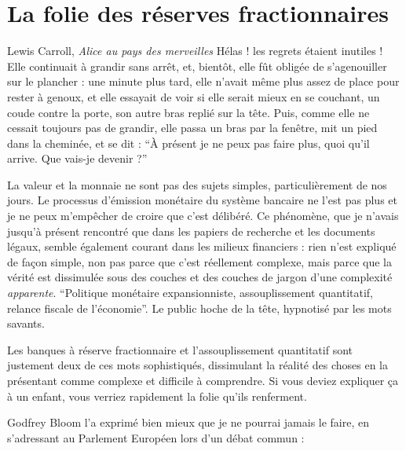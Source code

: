\chapter{La folie des réserves fractionnaires}
\label{les:13}

\begin{chapquote}{Lewis Carroll, \textit{Alice au pays des merveilles}}
Hélas ! les regrets étaient inutiles ! Elle continuait à grandir sans arrêt, et,
bientôt, elle fût obligée de s’agenouiller sur le plancher : une minute plus
tard, elle n’avait même plus assez de place pour rester à genoux, et elle
essayait de voir si elle serait mieux en se couchant, un coude contre la porte,
son autre bras replié sur la tête. Puis, comme elle ne cessait toujours pas de
grandir, elle passa un bras par la fenêtre, mit un pied dans la cheminée, et se
dit : \enquote{À présent je ne peux pas faire plus, quoi qu’il arrive. Que
vais-je devenir ?}
\end{chapquote}

La valeur et la monnaie ne sont pas des sujets simples, particulièrement de nos
jours. Le processus d'émission monétaire du système bancaire ne l'est pas plus
et je ne peux m'empêcher de croire que c'est délibéré. Ce phénomène, que je
n'avais jusqu'à présent rencontré que dans les papiers de recherche et les
documents légaux, semble également courant dans les milieux financiers : rien
n'est expliqué de façon simple, non pas parce que c'est réellement complexe,
mais parce que la vérité est dissimulée sous des couches et des couches de
jargon d'une complexité \textit{apparente}. \enquote{Politique monétaire
expansionniste, assouplissement quantitatif, relance fiscale de l'économie}. Le
public hoche de la tête, hypnotisé par les mots savants.

Les banques à réserve fractionnaire et l'assouplissement quantitatif sont
justement deux de ces mots sophistiqués, dissimulant la réalité des choses en la
présentant comme complexe et difficile à comprendre. Si vous deviez expliquer ça
à un enfant, vous verriez rapidement la folie qu'ils renferment.

Godfrey Bloom l'a exprimé bien mieux que je ne pourrai jamais le faire, en
s'adressant au Parlement Européen lors d'un débat commun :


